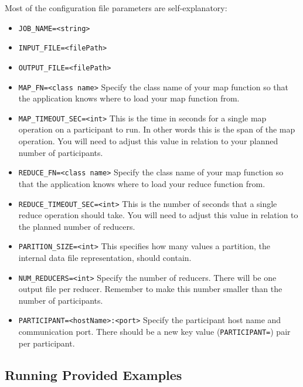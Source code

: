 \documentclass[12pt]{article}
\newcommand{\ttt}{\texttt}
\begin{document}
Most of the configuration file parameters are self-explanatory:

\begin{itemize}
\item
\ttt{JOB\_NAME=<string>}

\item
\ttt{INPUT\_FILE=<filePath>}

\item
\ttt{OUTPUT\_FILE=<filePath>}

\item
\ttt{MAP\_FN=<class name>} Specify the class name of your map function so that the application knows where to load your map function from.

\item
\ttt{MAP\_TIMEOUT\_SEC=<int>} This is the time in seconds for a single map operation on a participant to run. In other words this is the span of the map operation. You will need to adjust this value in relation to your planned number of participants.

\item
\ttt{REDUCE\_FN=<class name>} Specify the class name of your map function so that the application knows where to load your reduce function from.

\item
\ttt{REDUCE\_TIMEOUT\_SEC=<int>} This is the number of seconds that a single reduce operation should take. You will need to adjust this value in relation to the planned number of reducers.

\item
\ttt{PARITION\_SIZE=<int>} This specifies how many values a partition, the internal data file representation, should contain.

\item
\ttt{NUM\_REDUCERS=<int>} Specify the number of reducers. There will be one output file per reducer. Remember to make this number smaller than the number of participants.

\item
\ttt{PARTICIPANT=<hostName>:<port>} Specify the participant host name and communication port. There should be a new key value (\ttt{PARTICIPANT=}) pair per participant.

\end{itemize}

\subsection{Running Provided Examples}
\end{document}
